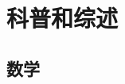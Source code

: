 

\renewcommand\thesubsubsection{\thesection.\arabic{subsection}.\arabic{subsubsection}}

\renewcommand{\thelstlisting}{\arabic{lstlisting}}
\begin{titlepage}

\newpage

\end{titlepage}
\frontmatter %
\setcounter{tocdepth}{1}
\tableofcontents %
\mainmatter %
\setcounter{secnumdepth}{3}

\part{科普和综述} \label{prt_PS}
\chapter{数学} \label{cpt_1ac}


